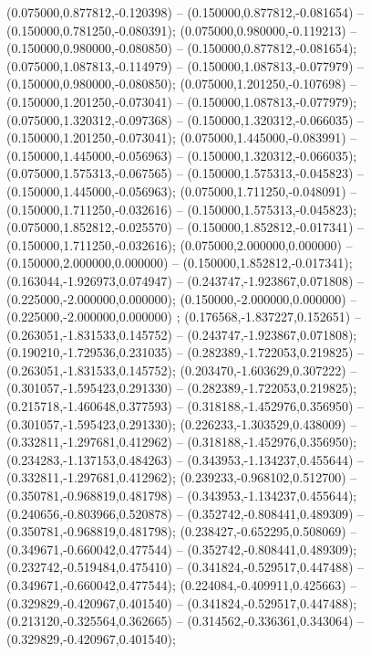  (0.075000,0.877812,-0.120398) -- (0.150000,0.877812,-0.081654) -- (0.150000,0.781250,-0.080391);
 (0.075000,0.980000,-0.119213) -- (0.150000,0.980000,-0.080850) -- (0.150000,0.877812,-0.081654);
 (0.075000,1.087813,-0.114979) -- (0.150000,1.087813,-0.077979) -- (0.150000,0.980000,-0.080850);
 (0.075000,1.201250,-0.107698) -- (0.150000,1.201250,-0.073041) -- (0.150000,1.087813,-0.077979);
 (0.075000,1.320312,-0.097368) -- (0.150000,1.320312,-0.066035) -- (0.150000,1.201250,-0.073041);
 (0.075000,1.445000,-0.083991) -- (0.150000,1.445000,-0.056963) -- (0.150000,1.320312,-0.066035);
 (0.075000,1.575313,-0.067565) -- (0.150000,1.575313,-0.045823) -- (0.150000,1.445000,-0.056963);
 (0.075000,1.711250,-0.048091) -- (0.150000,1.711250,-0.032616) -- (0.150000,1.575313,-0.045823);
 (0.075000,1.852812,-0.025570) -- (0.150000,1.852812,-0.017341) -- (0.150000,1.711250,-0.032616);
 (0.075000,2.000000,0.000000) -- (0.150000,2.000000,0.000000) -- (0.150000,1.852812,-0.017341);
 (0.163044,-1.926973,0.074947) -- (0.243747,-1.923867,0.071808) -- (0.225000,-2.000000,0.000000);
 (0.150000,-2.000000,0.000000) -- (0.225000,-2.000000,0.000000) ;
 (0.176568,-1.837227,0.152651) -- (0.263051,-1.831533,0.145752) -- (0.243747,-1.923867,0.071808);
 (0.190210,-1.729536,0.231035) -- (0.282389,-1.722053,0.219825) -- (0.263051,-1.831533,0.145752);
 (0.203470,-1.603629,0.307222) -- (0.301057,-1.595423,0.291330) -- (0.282389,-1.722053,0.219825);
 (0.215718,-1.460648,0.377593) -- (0.318188,-1.452976,0.356950) -- (0.301057,-1.595423,0.291330);
 (0.226233,-1.303529,0.438009) -- (0.332811,-1.297681,0.412962) -- (0.318188,-1.452976,0.356950);
 (0.234283,-1.137153,0.484263) -- (0.343953,-1.134237,0.455644) -- (0.332811,-1.297681,0.412962);
 (0.239233,-0.968102,0.512700) -- (0.350781,-0.968819,0.481798) -- (0.343953,-1.134237,0.455644);
 (0.240656,-0.803966,0.520878) -- (0.352742,-0.808441,0.489309) -- (0.350781,-0.968819,0.481798);
 (0.238427,-0.652295,0.508069) -- (0.349671,-0.660042,0.477544) -- (0.352742,-0.808441,0.489309);
 (0.232742,-0.519484,0.475410) -- (0.341824,-0.529517,0.447488) -- (0.349671,-0.660042,0.477544);
 (0.224084,-0.409911,0.425663) -- (0.329829,-0.420967,0.401540) -- (0.341824,-0.529517,0.447488);
 (0.213120,-0.325564,0.362665) -- (0.314562,-0.336361,0.343064) -- (0.329829,-0.420967,0.401540);
